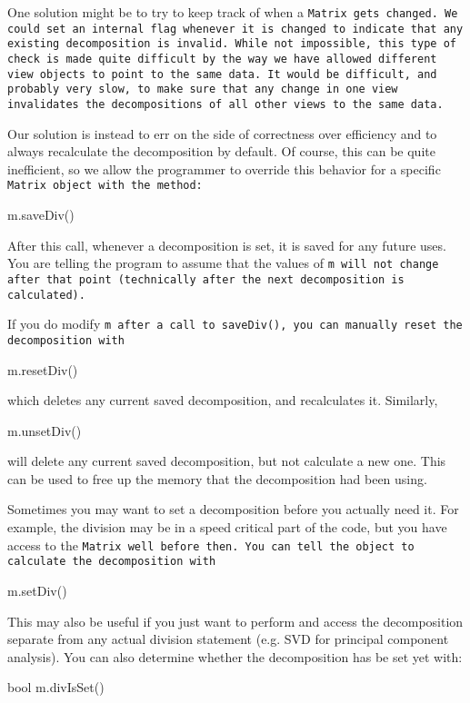 One solution might be to try to keep track of when a \tt{Matrix} gets changed.  
We could set an
internal flag whenever it is changed to indicate that
any existing decomposition is invalid.  While not impossible,
this type of check is made
quite difficult by the way we have allowed different view objects to point to the same data.  
It would
be difficult, and probably very slow, to make sure that any change in one view invalidates the decompositions
of all other views to the same data.

Our solution is instead to err on the side of correctness over efficiency and
to always recalculate the decomposition by default.  Of course, this
can be quite inefficient, so we allow the programmer to override this
behavior for a specific \tt{Matrix} object with the method:
\begin{tmvcode}
m.saveDiv()
\end{tmvcode}
After this call, whenever a decomposition is set, it is saved for any future uses.
You are telling the program to assume that the values of \tt{m} will not change after 
that point (technically after
the next decomposition is calculated).

If you do modify \tt{m} after a call to \tt{saveDiv()}, 
you can manually reset the decomposition with
\begin{tmvcode}
m.resetDiv()
\end{tmvcode}
which deletes any current saved decomposition, and recalculates it.
Similarly,
\begin{tmvcode}
m.unsetDiv()
\end{tmvcode}
will delete any current saved decomposition, but not calculate a new one.
This can be used to free up the memory that the decomposition had been using.

Sometimes you may want to set a decomposition before you actually need it.
For example, the division may be in a speed critical part of the code, but you have
access to the \tt{Matrix} well before then.  
You can tell the object to calculate the decomposition with
\begin{tmvcode}
m.setDiv()
\end{tmvcode}
This may also be useful if you just want to perform and access the decomposition
separate from any actual division statement (e.g. SVD for principal component analysis).
You can also determine whether the decomposition has be set yet with:
\begin{tmvcode}
bool m.divIsSet()
\end{tmvcode}

